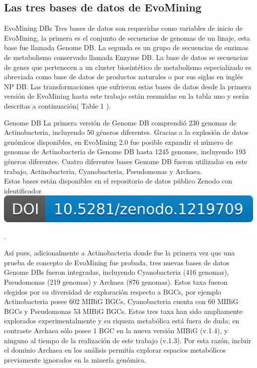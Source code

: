 \documentclass[12pt,twoside]{reedthesis}
\begin{document}
  \subsection{Las tres bases de datos de
  EvoMining}\label{las-tres-bases-de-datos-de-evomining}
  
  EvoMining DBs Tres bases de datos son requeridas como variables de
  inicio de EvoMining, la primera es el conjunto de secuencias de genomas
  de un linaje, esta base fue llamada Genome DB. La segunda es un grupo de
  secuencias de enzimas de metabolismo conservado llamada Enzyme DB. La
  base de datos se secuencias de genes que pertenecen a un cluster
  biosintético de metabolismo especializado es abreviada como base de
  datos de productos naturales o por sus siglas en inglés NP DB. Las
  transformaciones que sufrieron estas bases de datos desde la primera
  versión de EvoMining hasta este trabajo están resumidas en la tabla uno
  y serán descritas a continuación( Table 1 ).
  
  Genome DB La primera versión de Genome DB comprendió 230 genomas de
  Actinobacteria, incluyendo 50 géneros diferentes. Gracias a la explosión
  de datos genómicos disponibles, en EvoMining 2.0 fue posible expandir el
  número de genomas de Actinobacteria de Genome DB hasta 1245 genomes,
  incluyendo 193 géneros diferentes. Cuatro diferentes bases Genome DB
  fueron utilizadas en este trabajo, Actinobacteria, Cyanobacteria,
  Pseudomonas y Archaea.\\
  Estas bases están disponibles en el repositorio de datos público Zenodo
  con identificador
  \href{https://doi.org/10.5281/zenodo.1219709}{\includegraphics{chapter2/zenodo_1219709.png}}
  
  .
  
  Así pues, adicionalmente a Actinobacteria donde fue la primera vez que
  una prueba de concepto de EvoMining fue probada, tres nuevas bases de
  datos Genome DBs fueron integradas, incluyendo Cyanobacteria (416
  genomas), Pseudomonas (219 genomas) y Archaea (876 genomas). Estos taxa
  fueron elegidos por su diversidad de exploración respecto a BGCs, por
  ejemplo Actinobacteria posee 602 MIBiG BGCs, Cyanobacteria cuenta con 60
  MIBiG BGCs y Pseudomonas 53 MIBiG BGCs. Estos tres taxa han sido
  ampliamente explorados experimentalmente y su riqueza metabólica está
  fuera de duda; en contraste Archaea sólo posee 1 BGC en la nueva versión
  MIBiG (v.1.4), y ninguno al tiempo de la realización de este trabajo
  (v.1.3). Por esta razón, incluir el dominio Archaea en los análisis
  permitía explorar espacios metabólicos previamente ignorados en la
  minería genómica.
  
\end{document}
